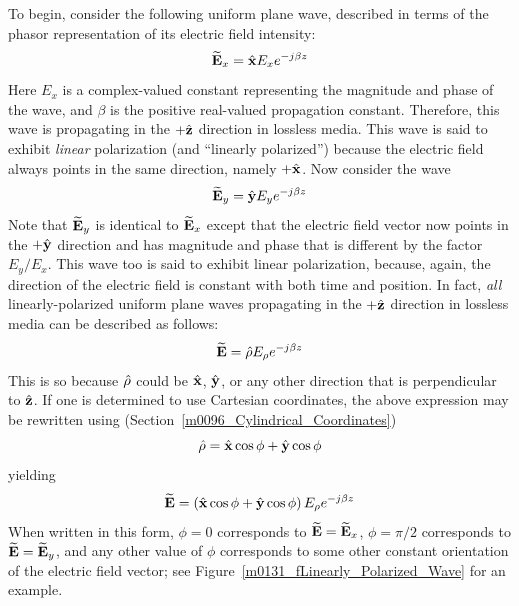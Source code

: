 To begin, consider the following uniform plane wave, described in terms of the phasor representation of its electric field intensity:
%
\begin{equation}
\widetilde{\bf E}_x = \hat{\bf x}E_x e^{-j\beta z}
\end{equation}
%
Here $E_x$ is a complex-valued constant representing the magnitude and phase of the wave,
and $\beta$ is the positive real-valued propagation constant.  
Therefore, this wave is propagating in the $+\hat{\bf z}$ direction in lossless media.
This wave is said to exhibit \emph{linear} polarization 
(and ``linearly polarized'')
 because the electric field always points in the same direction, namely $+\hat{\bf x}$.
Now consider the wave
%
\begin{equation}
\widetilde{\bf E}_y = \hat{\bf y}E_y e^{-j\beta z}
\end{equation}
%
Note that $\widetilde{\bf E}_y$ is identical to $\widetilde{\bf E}_x$ except that the electric field vector now points in the $+\hat{\bf y}$ direction and has magnitude and phase that is different by the factor $E_y/E_x$.
This wave too is said to exhibit linear polarization, because, again, the direction of the electric field is constant with both time and position.
In fact, \emph{all} linearly-polarized uniform plane waves propagating in the $+\hat{\bf z}$ direction in lossless media can be described as follows:
%
\begin{equation}
\widetilde{\bf E} = \hat{\bf \rho}E_{\rho} e^{-j\beta z}
\end{equation}
%
This is so because $\hat{\bf \rho}$ could be $\hat{\bf x}$, $\hat{\bf y}$, or any other direction that is perpendicular to $\hat{\bf z}$.
If one is determined to use Cartesian coordinates, the above expression may be rewritten using (Section~\ref{m0096_Cylindrical_Coordinates})
%
\begin{equation}
\hat{\bf \rho} = \hat{\bf x}\cos\phi + \hat{\bf y}\cos\phi
\end{equation}
%
yielding
%
\begin{equation}
\widetilde{\bf E} = \left( \hat{\bf x}\cos\phi + \hat{\bf y}\cos\phi \right) E_{\rho} e^{-j\beta z}
\label{m0131_eLinAI}
\end{equation}
%
When written in this form, 
$\phi=0$ corresponds to $\widetilde{\bf E}=\widetilde{\bf E}_x$,
$\phi=\pi/2$ corresponds to $\widetilde{\bf E}=\widetilde{\bf E}_y$,
and any other value of $\phi$ corresponds to some other constant orientation of the electric field vector;
see Figure~\ref{m0131_fLinearly_Polarized_Wave} for an example.

